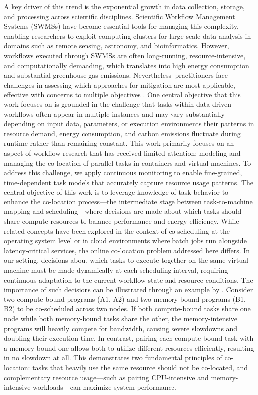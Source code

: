A key driver of this trend is the exponential growth in data collection, storage, and processing across scientific disciplines. Scientific Workflow Management Systems (SWMSs) have become essential tools for managing this complexity, enabling researchers to exploit computing clusters for large-scale data analysis in domains such as remote sensing, astronomy, and bioinformatics. However, workflows executed through SWMSs are often long-running, resource-intensive, and computationally demanding, which translates into high energy consumption and substantial greenhouse gas emissions. Nevertheless, practitioners face challenges in assessing which approaches for mitigation are most applicable, effective with concerns to multiple objectives \cite{thamsen2025energyawareworkflowexecutionoverview}.
One central objective that this work focuses on is grounded in the challenge that tasks within data-driven workflows often appear in multiple instances and may vary substantially depending on input data, parameters, or execution environments their patterns in resource demand, energy consumption, and carbon emissions fluctuate during runtime rather than remaining constant.
This work primarily focuses on an aspect of workflow research that has received limited attention: modeling and managing the co-location of parallel tasks in containers and virtual machines.
To address this challenge, we apply continuous monitoring to enable fine-grained, time-dependent task models that accurately capture resource usage patterns. The central objective of this work is to leverage knowledge of task behavior to enhance the co-location process—the intermediate stage between task-to-machine mapping and scheduling—where decisions are made about which tasks should share compute resources to balance performance and energy efficiency.
While related concepts have been explored in the context of co-scheduling at the operating system level or in cloud environments where batch jobs run alongside latency-critical services, the online co-location problem addressed here differs. In our setting, decisions about which tasks to execute together on the same virtual machine must be made dynamically at each scheduling interval, requiring continuous adaptation to the current workflow state and resource conditions. The importance of such decisions can be illustrated through an example by \cite{inproceedings}. Consider two compute-bound programs (A1, A2) and two memory-bound programs (B1, B2) to be co-scheduled across two nodes. If both compute-bound tasks share one node while both memory-bound tasks share the other, the memory-intensive programs will heavily compete for bandwidth, causing severe slowdowns and doubling their execution time. In contrast, pairing each compute-bound task with a memory-bound one allows both to utilize different resources efficiently, resulting in no slowdown at all. This demonstrates two fundamental principles of co-location: tasks that heavily use the same resource should not be co-located, and complementary resource usage—such as pairing CPU-intensive and memory-intensive workloads—can maximize system performance.
